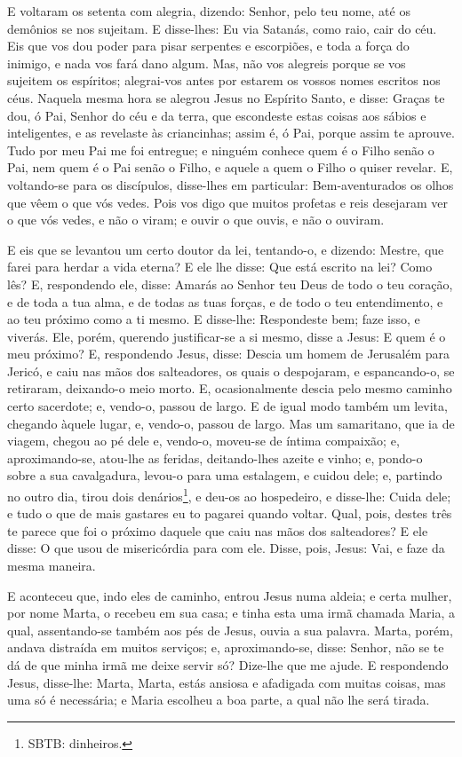 E voltaram os setenta com alegria, dizendo: Senhor, pelo teu
nome, até os demônios se nos sujeitam. E disse-lhes: Eu via
Satanás, como raio, cair do céu. Eis que vos dou poder para
pisar serpentes e escorpiões, e toda a força do inimigo, e nada vos
fará dano algum. Mas, não vos alegreis porque se vos sujeitem
os espíritos; alegrai-vos antes por estarem os vossos nomes escritos
nos céus. Naquela mesma hora se alegrou Jesus no Espírito
Santo, e disse: Graças te dou, ó Pai, Senhor do céu e da terra, que
escondeste estas coisas aos sábios e inteligentes, e as revelaste às
criancinhas; assim é, ó Pai, porque assim te aprouve. Tudo
por meu Pai me foi entregue; e ninguém conhece quem é o Filho senão
o Pai, nem quem é o Pai senão o Filho, e aquele a quem o Filho o
quiser revelar. E, voltando-se para os discípulos, disse-lhes
em particular: Bem-aventurados os olhos que vêem o que vós vedes.
Pois vos digo que muitos profetas e reis desejaram ver o que
vós vedes, e não o viram; e ouvir o que ouvis, e não o ouviram.

E eis que se levantou um certo doutor da lei, tentando-o, e
dizendo: Mestre, que farei para herdar a vida eterna? E ele
lhe disse: Que está escrito na lei? Como lês? E, respondendo
ele, disse: Amarás ao Senhor teu Deus de todo o teu coração, e de
toda a tua alma, e de todas as tuas forças, e de todo o teu
entendimento, e ao teu próximo como a ti mesmo. E disse-lhe:
Respondeste bem; faze isso, e viverás. Ele, porém, querendo
justificar-se a si mesmo, disse a Jesus: E quem é o meu próximo?
E, respondendo Jesus, disse: Descia um homem de Jerusalém
para Jericó, e caiu nas mãos dos salteadores, os quais o despojaram,
e espancando-o, se retiraram, deixando-o meio morto. E,
ocasionalmente descia pelo mesmo caminho certo sacerdote; e,
vendo-o, passou de largo. E de igual modo também um levita,
chegando àquele lugar, e, vendo-o, passou de largo. Mas um
samaritano, que ia de viagem, chegou ao pé dele e, vendo-o, moveu-se
de íntima compaixão; e, aproximando-se, atou-lhe as feridas,
deitando-lhes azeite e vinho; e, pondo-o sobre a sua cavalgadura,
levou-o para uma estalagem, e cuidou dele; e, partindo no
outro dia, tirou dois denários\footnote{SBTB: dinheiros.}, e deu-os
ao hospedeiro, e disse-lhe: Cuida dele; e tudo o que de mais
gastares eu to pagarei quando voltar. Qual, pois, destes três
te parece que foi o próximo daquele que caiu nas mãos dos
salteadores? E ele disse: O que usou de misericórdia para com
ele. Disse, pois, Jesus: Vai, e faze da mesma maneira.

E aconteceu que, indo eles de caminho, entrou Jesus numa aldeia;
e certa mulher, por nome Marta, o recebeu em sua casa; e
tinha esta uma irmã chamada Maria, a qual, assentando-se também aos
pés de Jesus, ouvia a sua palavra. Marta, porém, andava
distraída em muitos serviços; e, aproximando-se, disse: Senhor, não
se te dá de que minha irmã me deixe servir só? Dize-lhe que me
ajude. E respondendo Jesus, disse-lhe: Marta, Marta, estás
ansiosa e afadigada com muitas coisas, mas uma só é necessária;
e Maria escolheu a boa parte, a qual não lhe será tirada.

